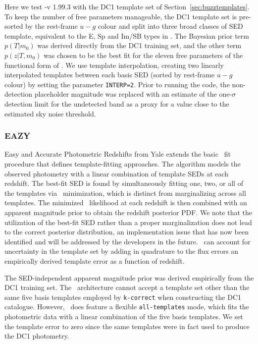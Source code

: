 Here we test \bpz-v 1.99.3 with the DC1 template set of Section~\ref{sec:buzztemplates}.
To keep the number of free parameters manageable, the DC1 template set is pre-sorted by the rest-frame $u-g$ colour and split into three broad classes of SED template, equivalent to the E, Sp and Im/SB types in .
The Bayesian prior term $p(T \vert m_{0})$ was derived directly from the DC1 training set, and the other term $p(z \vert T, m_{0})$ was chosen to be the best fit for the eleven free parameters of the functional form of \citet{Benitez:00}.  We use template interpolation, creating two linearly interpolated templates between each basis SED (sorted by rest-frame $u-g$ colour) by setting the parameter \texttt{INTERP=2}.
Prior to running the code, the non-detection placeholder magnitude was replaced with an estimate of the one-$\sigma$ detection limit for the undetected band as a proxy for a value close to the estimated sky noise threshold.

\subsubsection{EAZY}
\label{sec:eazy}

Easy and Accurate Photometric Redshifts from Yale \citep[\eazy\footnote{\url{https://github.com/gbrammer/eazy-photoz}},][]{Brammer:08} extends the basic \chisq\ fit procedure that defines template-fitting approaches.
The algorithm models the observed photometry with a linear combination of template SEDs at each redshift.
The best-fit SED is found by simultaneously fitting one, two, or all of the templates via \chisq\ minimization, which is distinct from marginalizing across all templates.
The minimized \chisq\ likelihood at each redshift is then combined with an apparent magnitude prior to obtain the redshift posterior PDF.
We note that the utilization of the best-fit SED rather than a proper marginalization does not lead to the correct posterior distribution, an implementation issue that has now been identified and will be addressed by the developers in the future.
\eazy\ can account for uncertainty in the template set by adding in quadrature to the flux errors an empirically derived template error as a function of redshift.

The SED-independent apparent magnitude prior was derived empirically from the DC1 training set.
The \eazy\ architecture cannot accept a template set other than the same five basis templates employed by \texttt{k-correct} when constructing the DC1 catalogue.
However, \eazy\ does feature a flexible \texttt{all-templates} mode, which fits the photometric data with a linear combination of the five basis templates.
We set the template error to zero since the same templates were in fact used to produce the DC1 photometry.

